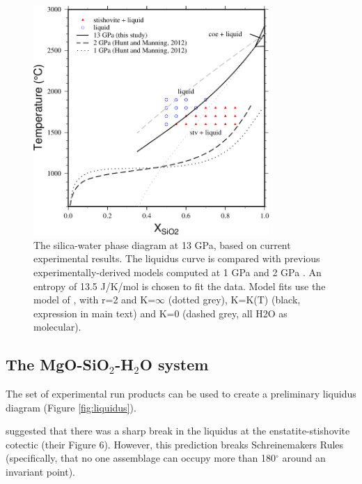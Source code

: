 \documentclass[review]{elsarticle}
\begin{document}
\begin{figure}[ht!]
  \centering
      \includegraphics[width=0.8\textwidth]{figures/SiO2-H2O}
  \caption{The silica-water phase diagram at 13 GPa, based on current experimental results. The liquidus curve is compared with previous experimentally-derived models computed at 1 GPa and 2 GPa \citep{HM2012}. An entropy of 13.5 J/K/mol is chosen to fit the data. Model fits use the model of \cite{SS1985}, with r=2 and K=$\infty$ (dotted grey), K=K(T) (black, expression in main text) and K=0 (dashed grey, all H2O as molecular).}
  \label{fig:SH}
\end{figure}


\clearpage
\subsection{The MgO-SiO$_2$-H$_2$O system}
The set of experimental run products can be used to create a preliminary liquidus diagram (Figure \ref{fig:liquidus}).

\cite{YII2004} suggested that there was a sharp break in the liquidus at the enstatite-stishovite cotectic (their Figure 6). However, this prediction breaks Schreinemakers Rules (specifically, that no one assemblage can occupy more than 180$^{\circ}$ around an invariant point).  
\end{document}
